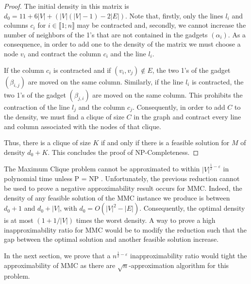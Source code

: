 \begin{proof}



The initial density in this matrix is $d_0 = 11 + 6|V| + (|V| (|V|-1) - 2|E|)$. Note that, firstly, only the lines $l_i$ and columns $c_i$ for $i \in \llbracket 1;n \rrbracket$ may be contracted and, secondly, we cannot increase the number of neighbors of the 1's that are not contained in the gadgets $(\alpha_i)$. As a consequence, in order to add one to the density of the matrix we must choose a node $v_i$ and contract the column $c_i$ and the line $l_i$. 

If the column $c_i$ is contracted and if $(v_i, v_j) \not \in E$, the two 1's of the gadget $(\beta_{i,j})$ are moved on the same column. Similarly, if the line $l_i$ is contracted, the two 1's of the gadget $(\beta_{j,i})$ are moved on the same column. This prohibits the contraction of the line $l_j$ and the column $c_j$. Consequently, in order to add $C$ to the density, we must find a clique of size $C$ in the graph and contract every line and column associated with the nodes of that clique.

Thus, there is a clique of size $K$ if and only if there is a feasible solution for $M$ of density $d_0 + K$. This concludes the proof of NP-Completeness.

\end{proof}
  
The Maximum Clique problem cannot be approximated to within $|V|^{\frac{1}{2} - \varepsilon}$ in polynomial time unless P = NP \cite{Hastad1999}. Unfortunately, the previous reduction cannot be used to prove a negative approximability result occurs for MMC. Indeed, the density of any feasible solution of the MMC instance we produce is between $d_0 + 1$ and $d_0 + |V|$, with $d_0 = O(|V|^2 - |E|)$. Consequently, the optimal density is at most $(1 + 1/|V|)$ times the worst density. A way to prove a high inapproximability ratio for MMC would be to modify the reduction such that the gap between the optimal solution and another feasible solution increase.

In the next section, we prove that a $n^{\frac{1}{2} - \varepsilon}$ inapproximability ratio would tight the approximability of MMC as there are $\sqrt{n}$-approximation algorithm for this problem.